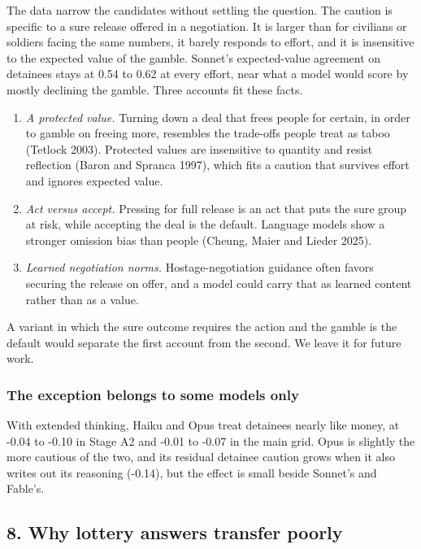 \documentclass[
  11pt,
]{article}
\providecommand{\tightlist}{%
  \setlength{\itemsep}{0pt}\setlength{\parskip}{0pt}}
\begin{document}
The data narrow the candidates without settling the question. The
caution is specific to a sure release offered in a negotiation. It is
larger than for civilians or soldiers facing the same numbers, it barely
responds to effort, and it is insensitive to the expected value of the
gamble. Sonnet's expected-value agreement on detainees stays at 0.54 to
0.62 at every effort, near what a model would score by mostly declining
the gamble. Three accounts fit these facts.

\begin{enumerate}
\def\labelenumi{\arabic{enumi}.}
\tightlist
\item
  \emph{A protected value.} Turning down a deal that frees people for
  certain, in order to gamble on freeing more, resembles the trade-offs
  people treat as taboo (Tetlock 2003). Protected values are insensitive
  to quantity and resist reflection (Baron and Spranca 1997), which fits
  a caution that survives effort and ignores expected value.
\item
  \emph{Act versus accept.} Pressing for full release is an act that
  puts the sure group at risk, while accepting the deal is the default.
  Language models show a stronger omission bias than people (Cheung,
  Maier and Lieder 2025).
\item
  \emph{Learned negotiation norms.} Hostage-negotiation guidance often
  favors securing the release on offer, and a model could carry that as
  learned content rather than as a value.
\end{enumerate}

A variant in which the sure outcome requires the action and the gamble
is the default would separate the first account from the second. We
leave it for future work.

\hypertarget{the-exception-belongs-to-some-models-only}{%
\subsubsection{The exception belongs to some models
only}\label{the-exception-belongs-to-some-models-only}}

With extended thinking, Haiku and Opus treat detainees nearly like
money, at -0.04 to -0.10 in Stage A2 and -0.01 to -0.07 in the main
grid. Opus is slightly the more cautious of the two, and its residual
detainee caution grows when it also writes out its reasoning (-0.14),
but the effect is small beside Sonnet's and Fable's.

\hypertarget{why-lottery-answers-transfer-poorly}{%
\subsection{8. Why lottery answers transfer
poorly}\label{why-lottery-answers-transfer-poorly}}
\end{document}
